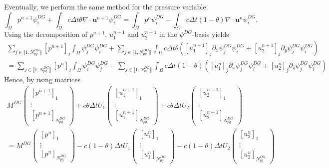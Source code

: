 \documentclass[a4paper, 11pt]{report}
\begin{document}
Eventually, we perform the same method for the pressure variable.
\begin{equation*}
\int_{\Omega}p^{n+1}\psi^{DG}_i+\int_{\Omega}c\Delta t \theta\nabla\cdot\boldsymbol{u}^{n+1}\psi^{DG}_i=\int_{\Omega}p^n\psi^{DG}_i-\int_{\Omega}c\Delta t (1-\theta)\nabla\cdot\boldsymbol{u}^{n}\psi^{DG}_i.
\end{equation*}
Using the decomposition of $p^{n+1}$, $u_1^{n+1}$ and $u_2^{n+1}$ in the $\psi^{DG}$-basis yields
\begin{multline*}
\sum_{j\in\llbracket1,N_{pg}^{DG}\rrbracket}\left[p^{n+1}\right]_j\int_{\Omega}\psi^{DG}_j\psi^{DG}_i+\sum_{j\in\llbracket1,N_{pg}^{DG}\rrbracket}\int_{\Omega}c\Delta t\theta\left(\left[u_1^{n+1}\right]_j\partial_x\psi^{DG}_j\psi^{DG}_i+\left[u_2^{n+1}\right]_j\partial_y\psi^{DG}_j\psi^{DG}_i\right)\\=\sum_{j\in\llbracket1,N_{pg}^{DG}\rrbracket}\left[p^n\right]_j\int_{\Omega}\psi^{DG}_i\psi^{DG}_j-\sum_{j\in\llbracket1,N_{pg}^{DG}\rrbracket}\int_{\Omega}c\Delta t(1-\theta)\left(\left[u_1^{n}\right]_j\partial_x\psi^{DG}_j\psi^{DG}_i+\left[u_2^{n}\right]_j\partial_y\psi^{DG}_j\psi^{DG}_i\right)
\end{multline*}
Hence, by using matrices
\begin{multline*}
M^{DG}\begin{pmatrix}\left[p^{n+1}\right]_1\\ \vdots \\ \left[p^{n+1}\right]_{N_{pg}^{DG}}\end{pmatrix}+c\theta\Delta t U_1 \begin{pmatrix} \left[u_1^{n+1}\right]_1\\ \vdots \\ \left[u_1^{n+1}\right]_{N_{pg}^{DG}}\end{pmatrix}+c\theta\Delta t U_2 \begin{pmatrix} \left[u_2^{n+1}\right]_1\\ \vdots \\ \left[u_2^{n+1}\right]_{N_{pg}^{DG}}\end{pmatrix}\\=M^{DG} \begin{pmatrix}\left[p^{n}\right]_1 \\ \vdots \\ \left[p^{n}\right]_{N_{pg}^{DG}}\end{pmatrix}-c(1-\theta)\Delta t U_1 \begin{pmatrix} \left[u_1^{n}\right]_1\\ \vdots \\ \left[u_1^{n}\right]_{N_{pg}^{DG}}\end{pmatrix}-c(1-\theta)\Delta t U_2 \begin{pmatrix} \left[u_2^{n}\right]_1\\ \vdots \\ \left[u_2^{n}\right]_{N_{pg}^{DG}}\end{pmatrix}
\end{multline*}
\end{document}
